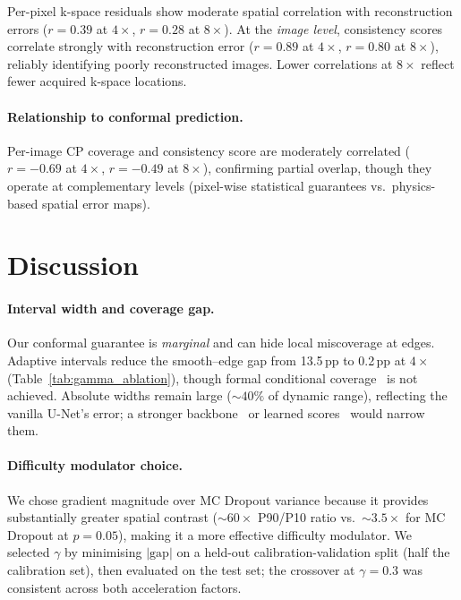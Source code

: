 \documentclass[runningheads]{llncs}
\begin{document}
Per-pixel k-space residuals show moderate spatial correlation with reconstruction errors ($r{=}0.39$ at $4{\times}$, $r{=}0.28$ at $8{\times}$). At the \emph{image level}, consistency scores correlate strongly with reconstruction error ($r{=}0.89$ at $4{\times}$, $r{=}0.80$ at $8{\times}$), reliably identifying poorly reconstructed images. Lower correlations at $8{\times}$ reflect fewer acquired k-space locations.

\paragraph{Relationship to conformal prediction.} Per-image CP coverage and consistency score are moderately correlated ($r{=}{-}0.69$ at $4{\times}$, $r{=}{-}0.49$ at $8{\times}$), confirming partial overlap, though they operate at complementary levels (pixel-wise statistical guarantees vs.\ physics-based spatial error maps).

\section{Discussion}
\label{sec:discussion}

\paragraph{Interval width and coverage gap.} Our conformal guarantee is \emph{marginal} and can hide local miscoverage at edges. Adaptive intervals reduce the smooth--edge gap from 13.5\,pp to 0.2\,pp at $4{\times}$ (Table~\ref{tab:gamma_ablation}), though formal conditional coverage~\cite{angelopoulos2022image} is not achieved. Absolute widths remain large (${\sim}40\%$ of dynamic range), reflecting the vanilla U-Net's error; a stronger backbone~\cite{hammernik2018varnet,sriram2020e2evarnet} or learned scores~\cite{angelopoulos2022image} would narrow them.

\paragraph{Difficulty modulator choice.} We chose gradient magnitude over MC Dropout variance because it provides substantially greater spatial contrast (${\sim}60{\times}$ P90/P10 ratio vs.\ ${\sim}3.5{\times}$ for MC Dropout at $p{=}0.05$), making it a more effective difficulty modulator. We selected $\gamma$ by minimising $|\text{gap}|$ on a held-out calibration-validation split (half the calibration set), then evaluated on the test set; the crossover at $\gamma{=}0.3$ was consistent across both acceleration factors.
\end{document}
